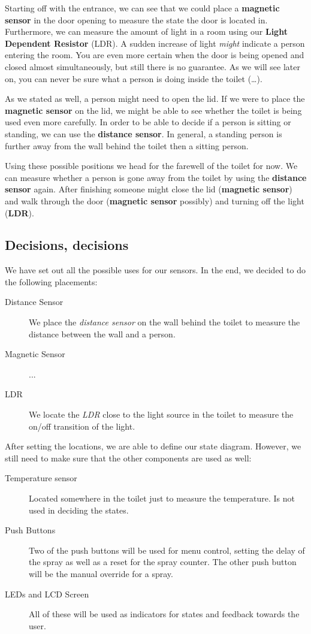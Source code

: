 \documentclass[a4paper, 11pt]{article}
\begin{document}
Starting off with the entrance, we can see that we could place a \textbf{magnetic sensor} in the door opening to measure the state the door is located in. Furthermore, we can measure the amount of light in a room using our \textbf{Light Dependent Resistor} (LDR). A sudden increase of light \emph{might} indicate a person entering the room. You are even more certain when the door is being opened and closed almost simultaneously, but still there is no guarantee. As we will see later on, you can never be sure what a person is doing inside the toilet (\ldots).

As we stated as well, a person might need to open the lid. If we were to place the \textbf{magnetic sensor} on the lid, we might be able to see whether the toilet is being used even more carefully. In order to be able to decide if a person is sitting or standing, we can use the \textbf{distance sensor}. In general, a standing person is further away from the wall behind the toilet then a sitting person.

Using these possible positions we head for the farewell of the toilet for now. We can measure whether a person is gone away from the toilet by using the \textbf{distance sensor} again. After finishing someone might close the lid (\textbf{magnetic sensor}) and walk through the door (\textbf{magnetic sensor} possibly) and turning off the light (\textbf{LDR}). 

\subsection{Decisions, decisions}

We have set out all the possible uses for our sensors. In the end, we decided to do the following placements:
\begin{description}
\item[Distance Sensor] We place the \textit{distance sensor} on the wall behind the toilet to measure the distance between the wall and a person.
\item[Magnetic Sensor] ...
\item[LDR] We locate the \textit{LDR} close to the light source in the toilet to measure the on/off transition of the light.
\end{description}

\noindent After setting the locations, we are able to define our state diagram. However, we still need to make sure that the other components are used as well:
\begin{description}
\item[Temperature sensor] Located somewhere in the toilet just to measure the temperature. Is not used in deciding the states.
\item[Push Buttons] Two of the push buttons will be used for menu control, setting the delay of the spray as well as a reset for the spray counter. The other push button will be the manual override for a spray.
\item[LEDs and LCD Screen] All of these will be used as indicators for states and feedback towards the user.
\end{description}
\end{document}
